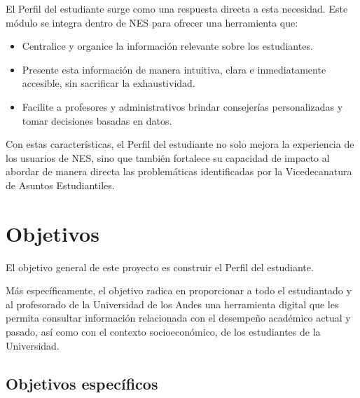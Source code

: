 El Perfil del estudiante surge como una respuesta directa a esta necesidad. Este módulo se integra dentro de \gls{NES} para ofrecer una herramienta que:
\begin{itemize}
	\item Centralice y organice la información relevante sobre los estudiantes.
	\item Presente esta información de manera intuitiva, clara e inmediatamente accesible, sin sacrificar la exhaustividad.
	\item Facilite a profesores y administrativos brindar consejerías personalizadas y tomar decisiones basadas en datos.
\end{itemize}

Con estas características, el Perfil del estudiante no solo mejora la experiencia de los usuarios de \gls{NES}, sino que también fortalece su capacidad de impacto al abordar de manera directa las problemáticas identificadas por la Vicedecanatura de Asuntos Estudiantiles.

\section{Objetivos}

El objetivo general de este proyecto es construir el Perfil del estudiante.

Más específicamente, el objetivo radica en proporcionar a todo el estudiantado y al profesorado de la Universidad de los Andes una herramienta digital que les permita consultar información relacionada con el desempeño académico actual y pasado, así como con el contexto socioeconómico, de los estudiantes de la Universidad.

\subsection{Objetivos específicos}


